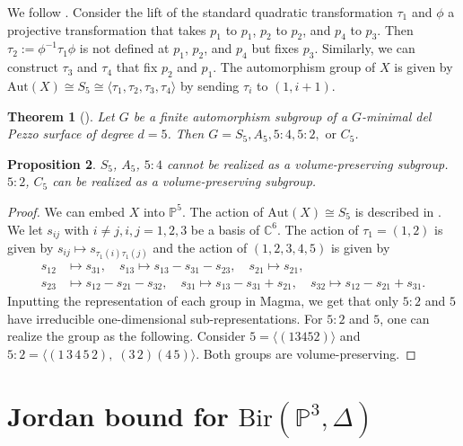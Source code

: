 \documentclass[a4paper,12pt,oneside]{amsart}
\numberwithin{equation}{section}
\newtheorem{theorem}{Theorem}[section]
\newtheorem{proposition}[theorem]{Proposition}
\theoremstyle{definition}
\theoremstyle{remark}
\begin{document}
We follow \cite{dolgachev2009finitesubgroupsplanecremona}. Consider the lift of the standard quadratic transformation \(\tau_1\) and \(\phi\) a projective transformation that takes \(p_1\) to \(p_1\), \(p_2\) to \(p_2\), and \(p_4\) to \(p_3\). Then \(\tau_2 :=\phi^{-1} \tau_1 \phi\) is not defined at \(p_1\), \(p_2\), and \(p_4\) but fixes \(p_3\). Similarly, we can construct \(\tau_3\) and \(\tau_4\) that fix \(p_2\) and \(p_1\). The automorphism group of $X$ is given by 
$
\mathrm{Aut}(X)\cong S_5 \cong \langle \tau_1, \tau_2, \tau_3, \tau_4 \rangle
$ by sending $\tau_i$ to $(1,i+1)$.
\begin{theorem}[{\cite[Theorem 6.4]{dolgachev2009finitesubgroupsplanecremona}}]
Let $G$ be a finite automorphism subgroup of a $G$-minimal del Pezzo surface of degree $d = 5$. Then $G = S_5, A_5, 5:4, 5:2, \text{ or }C_5$.
\end{theorem}

\begin{proposition}
$S_5$, $A_5$, $5:4$ cannot be realized as a volume-preserving subgroup. $5:2$, $C_5$ can be realized as a volume-preserving subgroup.
\end{proposition}
\begin{proof}
We can embed $X$ into $\mathbb{P}^5$. The action of $\mathrm{Aut}(X)\cong S_5$ is described in \cite[Theorem 0.1]{bauer2020mathfraks5equivariantsyzygiesdel}. We let $s_{ij}$ with $ i\neq j, i,j=1,2,3$ be a basis of $\mathbb C^6$. The action of $\tau_1=(1,2)$ is given by $s_{ij} \mapsto s_{\tau_1(i)\tau_1(j)}$ and the action of $(1,2,3,4,5)$ is given by \[
\begin{aligned}
s_{12} &\mapsto s_{31}, \quad s_{13} \mapsto s_{13} - s_{31} - s_{23}, \quad s_{21} \mapsto s_{21}, \\
s_{23} &\mapsto  s_{12} - s_{21} - s_{32}, \quad s_{31} \mapsto  s_{13} - s_{31} + s_{21}, \quad s_{32} \mapsto s_{12} - s_{21} + s_{31}.
\end{aligned}
\] Inputting the representation of each group in Magma, we get that only $5:2$ and $5$ have  irreducible one-dimensional sub-representations. For $5:2$ and $5$, one can realize the group as the following. Consider $5 = \langle(13452)\rangle$ and $5:2 = \langle (1\,3\,4\,5\,2),\; (3\,2)(4\,5) \rangle$. Both groups are volume-preserving.
\end{proof}




\section{Jordan bound for $\mathrm{Bir}(\mathbb P^3, \Delta)$}
\end{document}
